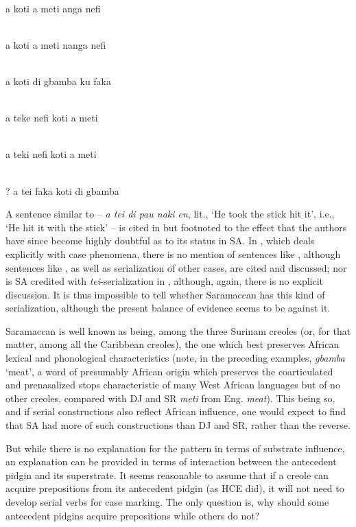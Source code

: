 \ea\label{ex:2:228}
\\
a koti a meti anga nefi
\z

\ea\label{ex:2:229}
\\
a koti a meti nanga nefi
\z

\ea\label{ex:2:230}
\\
a koti di gbamba ku faka
\z

\ea\label{ex:2:231}
\\
a teke nefi koti a meti
\z

\ea\label{ex:2:232}
\\
a teki nefi koti a meti
\z

\ea\label{ex:2:233}
\\
\textnormal{?} a tei faka koti di gbamba
\z

\noindent A sentence similar to  -- \textit{a tei di pau naki en}, lit., `He took the stick hit it', i.e., `He hit it with the stick' -- is cited in \citet{GrimesEtAl1970} but footnoted to the effect that the authors have since become highly doubtful as to its status in SA. In \citet{Glock1972}, which deals explicitly with case phenomena, there is no mention of sentences like , although sentences like , as well as serialization of other cases, are cited and discussed; nor is SA credited with \textit{tei}-serialization in \citet{JansenEtAl1978}, although, again, there is no explicit discussion. It is thus impossible to tell whether Saramaccan has this kind of serialization, although the present balance of evidence seems to be against it.

Saramaccan is well known as being, among the three Surinam creoles (or, for that matter, among all the Caribbean creoles), the one which best preserves African lexical and phonological characteristics
(note, in the preceding examples, \textit{gbamba} `meat', a word of presumably African origin which preserves the coarticulated and prenasalized stops characteristic of many West African languages but of no other creoles, compared with DJ and SR \textit{meti} from Eng. \textit{meat}). This being so, and if serial constructions also reflect African influence, one would expect to find that SA had more of such constructions than DJ and SR, rather than the reverse.

But while there is no explanation for the pattern in terms of substrate influence, an explanation can be provided in terms of interaction between the antecedent pidgin and its superstrate. It seems reasonable to assume that if a creole can acquire prepositions from its antecedent pidgin (as HCE did), it will not need to develop serial verbs for case marking. The only question is, why should some antecedent pidgins acquire prepositions while others do not?

